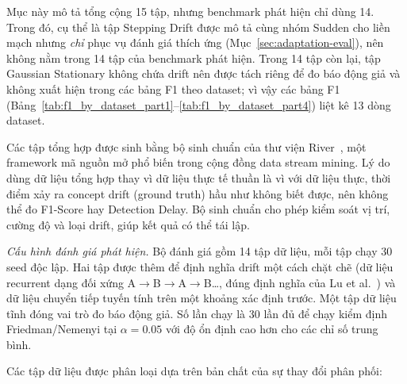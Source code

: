 Mục này mô tả tổng cộng 15 tập, nhưng benchmark phát hiện chỉ dùng 14. Trong đó, cụ thể là tập Stepping Drift được mô tả cùng nhóm Sudden cho liền mạch nhưng \emph{chỉ} phục vụ đánh giá thích ứng (Mục~\ref{sec:adaptation-eval}), nên không nằm trong 14 tập của benchmark phát hiện. Trong 14 tập còn lại, tập Gaussian Stationary không chứa drift nên được tách riêng để đo báo động giả và không xuất hiện trong các bảng F1 theo dataset; vì vậy các bảng F1 (Bảng~\ref{tab:f1_by_dataset_part1}--\ref{tab:f1_by_dataset_part4}) liệt kê 13 dòng dataset.

Các tập tổng hợp được sinh bằng bộ sinh chuẩn của thư viện River~\cite{river2021}, một framework mã nguồn mở phổ biến trong cộng đồng data stream mining. Lý do dùng dữ liệu tổng hợp thay vì dữ liệu thực tế thuần là vì với dữ liệu thực, thời điểm xảy ra concept drift (ground truth) hầu như không biết được, nên không thể đo F1-Score hay Detection Delay. Bộ sinh chuẩn cho phép kiểm soát vị trí, cường độ và loại drift, giúp kết quả có thể tái lập.

\textit{Cấu hình đánh giá phát hiện.} Bộ đánh giá gồm 14 tập dữ liệu, mỗi tập chạy 30 seed độc lập. Hai tập được thêm để định nghĩa drift một cách chặt chẽ (dữ liệu recurrent dạng đối xứng A$\to$B$\to$A$\to$B\dots, đúng định nghĩa của Lu et al.~\cite{lu2018learning}) và dữ liệu chuyển tiếp tuyến tính trên một khoảng xác định trước. Một tập dữ liệu tĩnh đóng vai trò đo báo động giả. Số lần chạy là 30 lần đủ để chạy kiểm định Friedman/Nemenyi tại $\alpha = 0.05$ với độ ổn định cao hơn cho các chỉ số trung bình.

Các tập dữ liệu được phân loại dựa trên bản chất của sự thay đổi phân phối:

